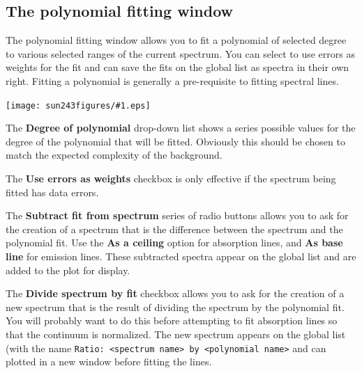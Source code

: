 \documentclass[twoside,11pt]{article}
\newcommand{\htmladdimg}[1]{}
\newcommand{\latexhtml}[2]{#1}
\renewcommand{\_}{\texttt{\symbol{95}}}
\newcommand{\mainfigure}[1]
{\begin{center}
 \latexhtml{\texttt{[image: sun243\_figures/\#1.eps]}}{\htmladdimg{#1.gif}}
 \end{center}
}
\newcommand{\labelitem}[1]{\textbf{#1}}
\newcommand{\hitext}[1]{\texttt{#1}}
\begin{document}
\newpage
\subsection{The polynomial fitting window}

The polynomial fitting window allows you to fit a polynomial of selected
degree to various selected ranges of the current spectrum. You can select to
use errors as weights for the fit and can save the fits on the global list as
spectra in their own right. Fitting a polynomial is generally a pre-requisite
to fitting spectral lines.

\mainfigure{polynomialfitwindow}

The \labelitem{Degree of polynomial} drop-down list shows a series
possible values for the degree of the polynomial that will be
fitted. Obviously this should be chosen to match the expected
complexity of the background.

The \labelitem{Use errors as weights} checkbox is only effective if
the spectrum being fitted has data errors.

The \labelitem{Subtract fit from spectrum} series of radio buttons
allows you to ask for the creation of a spectrum that is the difference
between the spectrum and the polynomial fit. Use the \labelitem{As a
ceiling} option for absorption lines, and \labelitem{As base line} for
emission lines. These subtracted spectra appear on the global list and
are added to the plot for display.

The \labelitem{Divide spectrum by fit} checkbox allows you to ask for
the creation of a new spectrum that is the result of dividing the
spectrum by the polynomial fit. You will probably want to do this
before attempting to fit absorption lines so that the continuum is
normalized. The new spectrum appears on the global list (with the
name \hitext{Ratio: <spectrum name> by <polynomial name>} and can
plotted in a new window before fitting the lines.
\end{document}

